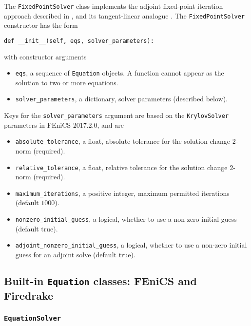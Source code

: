 \documentclass[11pt]{article}
\begin{document}
The \texttt{FixedPointSolver} class implements the adjoint fixed-point
iteration approach described in \citet{christianson1994}, and its
tangent-linear analogue \citep{gilbert1992}. The \texttt{FixedPointSolver}
constructor has the form
\begin{lstlisting}
def __init__(self, eqs, solver_parameters):
\end{lstlisting}
with constructor arguments
\begin{itemize}
  \item \texttt{eqs}, a sequence of \texttt{Equation} objects. A function
    cannot appear as the solution to two or more equations.
  \item \texttt{solver\_parameters}, a dictionary, solver parameters (described
    below).
\end{itemize}
Keys for the \texttt{solver\_parameters} argument are based on the
\texttt{KrylovSolver} parameters in FEniCS 2017.2.0, and are
\begin{itemize}
  \item \texttt{absolute\_tolerance}, a float, absolute tolerance for the
    solution change $2$-norm (required).
  \item \texttt{relative\_tolerance}, a float, relative tolerance for the
    solution change $2$-norm (required).
  \item \texttt{maximum\_iterations}, a positive integer, maximum permitted
    iterations (default $1000$).
  \item \texttt{nonzero\_initial\_guess}, a logical, whether to use a non-zero
    initial guess (default true).
  \item \texttt{adjoint\_nonzero\_initial\_guess}, a logical, whether to use a
    non-zero initial guess for an adjoint solve (default true).
\end{itemize}

\subsection{Built-in \texttt{Equation} classes: FEniCS and Firedrake}

\subsubsection{\texttt{EquationSolver}}\label{sect:EquationSolver}
\end{document}
